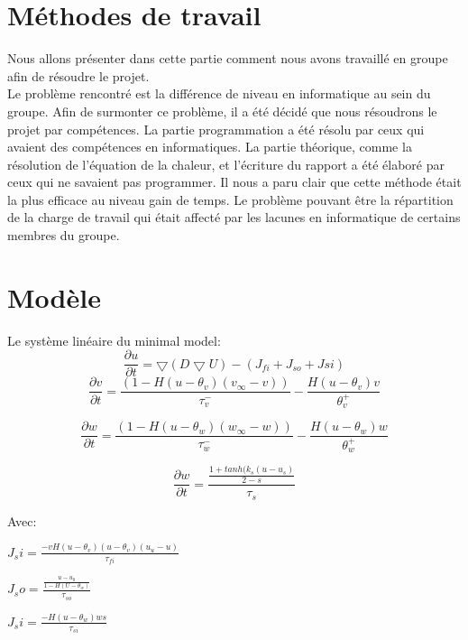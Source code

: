 \documentclass[a4paper,12pt,twoside]{report}
\begin{document}
\section{Méthodes de travail}


Nous allons présenter dans cette partie comment nous avons travaillé en groupe afin de résoudre le projet.\\ 
\hspace*{1cm} Le problème rencontré est la différence de niveau en informatique au sein du groupe. Afin de surmonter ce problème, il a été décidé que nous résoudrons le projet par compétences. La partie programmation a été résolu par ceux qui avaient des compétences en informatiques. La partie théorique, comme la résolution de l'équation de la chaleur, et l'écriture du rapport a été élaboré par ceux qui ne savaient pas programmer. Il nous a paru clair que cette méthode était la plus efficace au niveau gain de temps. Le problème pouvant être la répartition de la charge de travail qui était affecté par les lacunes en informatique de certains membres du groupe.\\
















\section{Modèle}




Le système linéaire du minimal model: 
\begin{equation}
\frac{\partial u}{\partial t}=\bigtriangledown( D \bigtriangledown U )-(J_{fi}+J_{so}+	J{si})
\end{equation}
\begin{equation}
\frac{\partial v}{\partial t}=\frac{(1-H(u-\theta_v)(v_\infty -v))}{\tau_v^-}-\frac{H(u-\theta_v)v}{\theta_v^+}
\end{equation}

\begin{equation}
\frac{\partial w}{\partial t}=\frac{(1-H(u-\theta_w)(w_\infty -w))}{\tau_w^-}-\frac{H(u-\theta_w)w}{\theta_w^+}
\end{equation}

\begin{equation}
\frac{\partial w}{\partial t}=\frac{\frac{1+tanh(k_s(u-u_s)}{2-s}}{\tau_s}
\end{equation}

Avec:

$J_si=\frac{-vH(u-\theta_v)(u-\theta_v)(u_u-u)}{\tau_{fi}}$


$J_so=\frac{\frac{u-u_0}{1-H(U-\theta_w)}}{\tau_{so}}$


$J_si=\frac{-H(u-\theta_w)ws}{\tau_{si}}$
\end{document}

